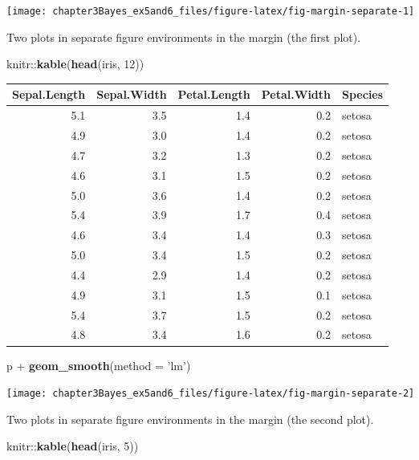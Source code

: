 \documentclass[]{tufte-handout}
\newenvironment{Shaded}{}{}
\newcommand{\KeywordTok}[1]{\textcolor[rgb]{0.00,0.44,0.13}{\textbf{{#1}}}}
\newcommand{\DataTypeTok}[1]{\textcolor[rgb]{0.56,0.13,0.00}{{#1}}}
\newcommand{\DecValTok}[1]{\textcolor[rgb]{0.25,0.63,0.44}{{#1}}}
\newcommand{\StringTok}[1]{\textcolor[rgb]{0.25,0.44,0.63}{{#1}}}
\newcommand{\NormalTok}[1]{{#1}}
\begin{document}
\begin{marginfigure}
\texttt{[image: chapter3Bayes\_ex5and6\_files/figure-latex/fig-margin-separate-1]} \caption[Two plots in separate figure environments in the margin (the first plot)]{Two plots in separate figure environments in the margin (the first plot).}\label{fig:fig-margin-separate1}
\end{marginfigure}

\begin{Shaded}
\begin{Highlighting}[]
\NormalTok{knitr::}\KeywordTok{kable}\NormalTok{(}\KeywordTok{head}\NormalTok{(iris, }\DecValTok{12}\NormalTok{))}
\end{Highlighting}
\end{Shaded}

\begin{longtable}[c]{@{}rrrrl@{}}
\toprule
Sepal.Length & Sepal.Width & Petal.Length & Petal.Width &
Species\tabularnewline
\midrule
\endhead
5.1 & 3.5 & 1.4 & 0.2 & setosa\tabularnewline
4.9 & 3.0 & 1.4 & 0.2 & setosa\tabularnewline
4.7 & 3.2 & 1.3 & 0.2 & setosa\tabularnewline
4.6 & 3.1 & 1.5 & 0.2 & setosa\tabularnewline
5.0 & 3.6 & 1.4 & 0.2 & setosa\tabularnewline
5.4 & 3.9 & 1.7 & 0.4 & setosa\tabularnewline
4.6 & 3.4 & 1.4 & 0.3 & setosa\tabularnewline
5.0 & 3.4 & 1.5 & 0.2 & setosa\tabularnewline
4.4 & 2.9 & 1.4 & 0.2 & setosa\tabularnewline
4.9 & 3.1 & 1.5 & 0.1 & setosa\tabularnewline
5.4 & 3.7 & 1.5 & 0.2 & setosa\tabularnewline
4.8 & 3.4 & 1.6 & 0.2 & setosa\tabularnewline
\bottomrule
\end{longtable}

\begin{Shaded}
\begin{Highlighting}[]
\NormalTok{p +}\StringTok{ }\KeywordTok{geom_smooth}\NormalTok{(}\DataTypeTok{method =} \StringTok{'lm'}\NormalTok{)}
\end{Highlighting}
\end{Shaded}

\begin{marginfigure}
\texttt{[image: chapter3Bayes\_ex5and6\_files/figure-latex/fig-margin-separate-2]} \caption[Two plots in separate figure environments in the margin (the second plot)]{Two plots in separate figure environments in the margin (the second plot).}\label{fig:fig-margin-separate2}
\end{marginfigure}

\begin{Shaded}
\begin{Highlighting}[]
\NormalTok{knitr::}\KeywordTok{kable}\NormalTok{(}\KeywordTok{head}\NormalTok{(iris, }\DecValTok{5}\NormalTok{))}
\end{Highlighting}
\end{Shaded}
\end{document}
